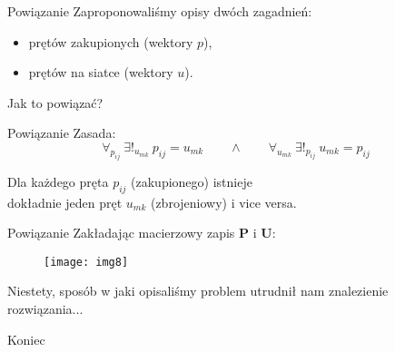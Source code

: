 \documentclass[11pt]{beamer}
\begin{document}
\begin{frame}{Powiązanie}
Zaproponowaliśmy opisy dwóch zagadnień:
\begin{itemize}
\item prętów zakupionych (wektory $p$),
\item prętów na siatce (wektory $u$).
\end{itemize}

\pause

Jak to powiązać?
\end{frame}

\begin{frame}{Powiązanie}
Zasada:
\begin{equation*}
\forall_{p_{ij}} \ \exists!_{u_{mk}} \ p_{ij} = u_{mk}
\qquad \land \qquad
\forall_{u_{mk}} \ \exists!_{p_{ij}} \ u_{mk} = p_{ij}
\end{equation*}

\vspace{0.5cm}

\begin{center}
Dla każdego pręta $p_{ij}$ (zakupionego) istnieje \\ dokładnie jeden pręt $u_{mk}$ (zbrojeniowy) i vice versa.
\end{center}
\end{frame}

\begin{frame}{Powiązanie}
Zakładając macierzowy zapis $\mathbf{P}$ i $\mathbf{U}$:
\begin{figure}[h!]
	\centering
	\texttt{[image: img8]}
\end{figure}
\end{frame}

\begin{frame}
Niestety, sposób w jaki opisaliśmy problem utrudnił nam znalezienie rozwiązania...
\end{frame}

\begin{frame}
\begin{center}
\LARGE Koniec
\end{center}
\end{frame}
\end{document}
